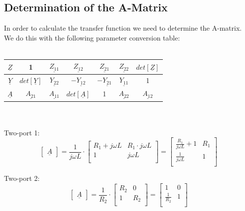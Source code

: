 \documentclass[a4paper]{article}
\begin{document}
\subsection*{Determination of the A-Matrix}
In order to calculate the transfer function we need to determine the A-matrix. We do this with the following parameter
conversion table:\\\\
\begin{tabular}{|c|c|c|c|c|c|c|}
	\hline
	$\underline{Z}$ & 1 & $\underline{Z_{11}}$ & $\underline{Z_{12}}$ & $\underline{Z_{21}}$ & $\underline{Z_{22}}$ & $det[\underline{Z}]$\\[1ex]
	\hline 
	$\underline{Y}$ & $det[\underline{Y}]$ & $\underline{Y_{22}}$ & $-\underline{Y_{12}}$ & $-\underline{Y_{21}}$ & $\underline{Y_{11}}$ & 1\\[1ex]
	\hline
	$\underline{A}$ & $\underline{A_{21}}$ & $\underline{A_{11}}$ & $det[\underline{A}]$ & 1 & $\underline{A_{22}}$ &$\underline{A_{12}}$\\[1ex]
	\hline
\end{tabular}\\\\
Two-port 1:\\
\begin{equation*}
	\begin{bmatrix}
		\underline{A}
	\end{bmatrix}=
	\frac{1}{j\omega L} \cdot
	\begin{bmatrix}
		R_1 + j\omega L & R_1 \cdot j\omega L\\
		1 & j\omega L\\
	\end{bmatrix} =
	\begin{bmatrix}
		\frac{R_1}{j\omega L} + 1 & R_1\\
		\frac{1}{j\omega L} & 1\\
	\end{bmatrix}
\end{equation*}

Two-port 2:\\
\begin{equation*}
	\begin{bmatrix}
		\underline{A}
	\end{bmatrix}=
	\frac{1}{R_2} \cdot
	\begin{bmatrix}
		R_2 & 0\\
		1 & R_2\\
	\end{bmatrix} =
	\begin{bmatrix}
		1 & 0\\
		\frac{1}{R_2} & 1\\
	\end{bmatrix}
\end{equation*}
\end{document}
